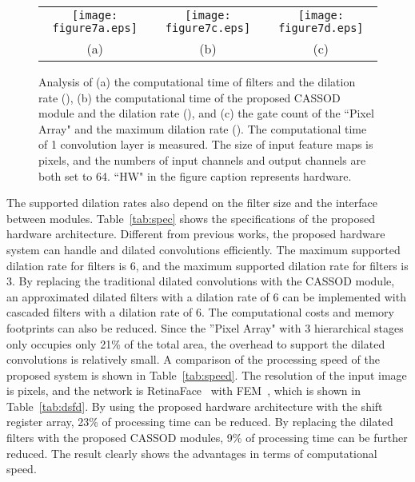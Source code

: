 \documentclass[10pt,twocolumn,letterpaper]{article}
\begin{document}
\begin{figure*}[t]
\begin{center}
\begin{tabular}{ccc}
\texttt{[image: figure7a.eps]} & \texttt{[image: figure7c.eps]} & \texttt{[image: figure7d.eps]} \\
(a) & (b) & (c)\\
\end{tabular}   
\end{center}
   \caption{Analysis of (a) the computational time of  filters and the dilation rate (), (b) the computational time of the proposed CASSOD module and the dilation rate (), and (c) the gate count of the ``Pixel Array" and the maximum dilation rate (). The computational time of 1 convolution layer is measured. The size of input feature maps is  pixels, and the numbers of input channels and output channels are both set to 64. ``HW" in the figure caption represents hardware.}
\label{fig:hardware}
\end{figure*}

The supported dilation rates also depend on the filter size and the interface between modules. Table~\ref{tab:spec} shows the specifications of the proposed hardware architecture. Different from previous works, the proposed hardware system can handle  and  dilated convolutions efficiently. The maximum supported dilation rate for  filters is 6, and the maximum supported dilation rate for  filters is 3. By replacing the traditional dilated convolutions with the CASSOD module, an approximated  dilated filters with a dilation rate of 6 can be implemented with cascaded  filters with a dilation rate of 6. The computational costs and memory footprints can also be reduced. Since the ''Pixel Array" with 3 hierarchical stages only occupies only 21\% of the total area, the overhead to support the dilated convolutions is relatively small. A comparison of the processing speed of the proposed system is shown in Table~\ref{tab:speed}. The resolution of the input image is  pixels, and the network is RetinaFace~\cite{Deng19} with FEM~\cite{Li18_1}, which is shown in Table~\ref{tab:dsfd}. By using the proposed hardware architecture with the shift register array, 23\% of processing time can be reduced. By replacing the dilated  filters with the proposed CASSOD modules, 9\% of processing time can be further reduced. The result clearly shows the advantages in terms of computational speed.
\end{document}

